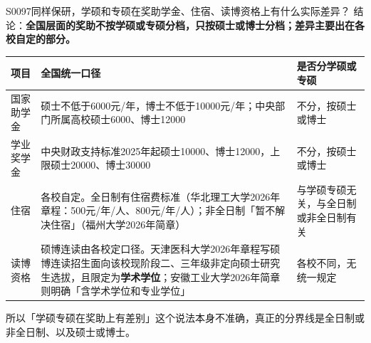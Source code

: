 \begin{qa}{S0097}{同样保研，学硕和专硕在奖助学金、住宿、读博资格上有什么实际差异？}
结论：\textbf{全国层面的奖助不按学硕或专硕分档，只按硕士或博士分档；差异主要出在各校自定的部分。}

\par\vspace{2pt}\nobreak\begin{center}\footnotesize
\begin{tabularx}{\textwidth}{>{\raggedright\arraybackslash}X>{\raggedright\arraybackslash}X>{\raggedright\arraybackslash}X}
\toprule
\textbf{项目} & \textbf{全国统一口径} & \textbf{是否分学硕或专硕} \\ \midrule
国家助学金 & 硕士不低于6000元/年，博士不低于10000元/年；中央部门所属高校硕士6000、博士12000 & 不分，按硕士或博士 \\
学业奖学金 & 中央财政支持标准2025年起硕士10000、博士12000，上限硕士20000、博士30000 & 不分，按硕士或博士 \\
住宿 & 各校自定。全日制有住宿费标准（华北理工大学2026年章程：500元/年/人、800元/年/人）；非全日制「暂不解决住宿」（福州大学2026年简章） & 与学硕专硕无关，与全日制或非全日制有关 \\
读博资格 & 硕博连读由各校定口径。天津医科大学2026年章程写硕博连读招生面向该校现阶段二、三年级非定向硕士研究生选拔，且限定为\textbf{学术学位}；安徽工业大学2026年简章则明确「含学术学位和专业学位」 & 各校不同，无统一规定 \\
\bottomrule
\end{tabularx}
\end{center}\vspace{2pt}\par

所以「学硕专硕在奖助上有差别」这个说法本身不准确，真正的分界线是全日制或非全日制、以及硕士或博士。
\end{qa}

